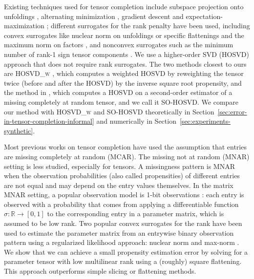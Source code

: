 \documentclass{article}
\newcommand{\RR}{\mathbb{R}}
\theoremstyle{plain}
\begin{document}
Existing techniques used for tensor completion include subspace projection onto unfoldings \cite{krishnamurthy2013low}, alternating minimization \cite{jain2014provable, liu2020tensor, wang2016tensor}, gradient descent \cite{yuan2018high} and expectation-maximization \cite{yokota2018missing}; 
different surrogates for the rank penalty have been used, including convex surrogates like nuclear norm on unfoldings \cite{tomioka2010estimation, gandy2011tensor, aidini20181} or specific flattenings \cite{mu2014square} and the maximum norm on factors \cite{ghadermarzy2018learning}, and nonconvex surrogates such as the minimum number of rank-1 sign tensor components \cite{ghadermarzy2018learning}.
We use a higher-order SVD (HOSVD) approach that does not require rank surrogates. 
The two methods closest to ours are \textsc{HOSVD\_w} \cite{huang2020hosvd}, which computes a weighted HOSVD by reweighting the tensor twice (before and after the HOSVD) by the inverse square root propensity, and the method in \cite{xia2017statistically}, which computes a HOSVD on a second-order estimator of a missing completely at random tensor, and we call it \textsc{SO-HOSVD}. 
We compare our method with \textsc{HOSVD\_w} and \textsc{SO-HOSVD} theoretically in Section~\ref{sec:error-in-tensor-completion-informal} and numerically in Section~\ref{sec:experiments-synthetic}.

Most previous works on tensor completion have used the assumption that entries are missing completely at random (MCAR).
The missing not at random (MNAR) setting is less studied,
especially for tensors.
A missingness pattern is MNAR when the observation probabilities (also called propensities) of different entries are not equal and may depend on the entry values themselves.
In the matrix MNAR setting, a popular observation model is 1-bit observations \cite{davenport20141}:
each entry is observed with a probability that comes from applying a differentiable function $\sigma: \RR \rightarrow [0, 1]$ to the corresponding entry in a parameter matrix, which is assumed to be low rank.
Two popular convex surrogates for the rank have been used to
estimate the parameter matrix from an entrywise binary observation pattern using a regularized likelihood approach: nuclear norm \cite{davenport20141, ma2019missing, aidini20181}
and max-norm \cite{cai2013max, ghadermarzy2018learning}.
We show that we can achieve a small propensity estimation error by solving for a parameter tensor with low multilinear rank using a (roughly) square flattening.
This approach outperforms simple slicing or flattening methods.
\end{document}
